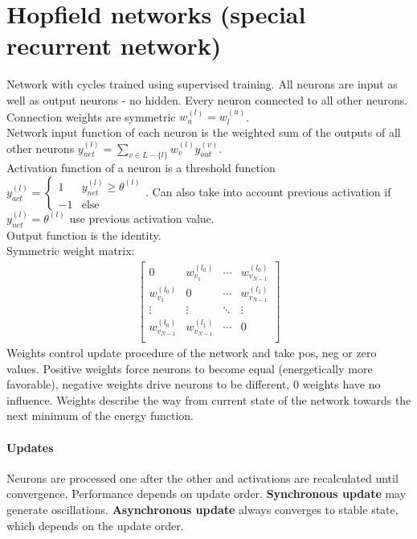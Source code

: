 \section{Hopfield networks (special recurrent network)}
Network with cycles trained using supervised training. All neurons are input as well as output neurons - no hidden. Every neuron connected to all other neurons. Connection weights are symmetric $w_u^{(l)}=w_l^{(u)}$.\\
 Network input function of each neuron is the weighted sum of the outputs of all other neurons $y_{net}^{(l)}=\sum_{v\in L-\{l\}} w_v^{(l)} y_{out}^{(v)}$.\\
Activation function of a neuron is a threshold function $y_{act}^{(l)} = \begin{cases} 1 & y_{net}^{(l)}\geq \theta^{(l)} \\ -1 & \text{else} \end{cases}$. Can also take into account previous activation if $y_{net}^{(l)}=\theta^{(l)}$ use previous activation value.\\
Output function is the identity.\\
Symmetric weight matrix: 
\begin{align*}
\begin{bmatrix}
0 & w_{v_1}^{(l_0)} & \cdots & w_{v_{N-1}}^{(l_0)} \\
w_{v_1}^{(l_0)} & 0 & \cdots & w_{v_{N-1}}^{(l_1)} \\
\vdots & \vdots & \ddots & \vdots \\
w_{v_{N-1}}^{(l_0)} & w_{v_{N-1}}^{(l_1)} & \cdots & 0 \\
\end{bmatrix}
\end{align*}
Weights control update procedure of the network and take pos, neg or zero values. Positive weights force neurons to become equal (energetically more favorable), negative weights drive neurons to be different, 0 weights have no influence. Weights describe the way from current state of the network towards the next minimum of the energy function.

\paragraph{Updates}
Neurons are processed one after the other and activations are recalculated until convergence. Performance depends on update order.
\textbf{Synchronous update} may generate oscillations.
\textbf{Asynchronous update} always converges to stable state, which depends on the update order.


